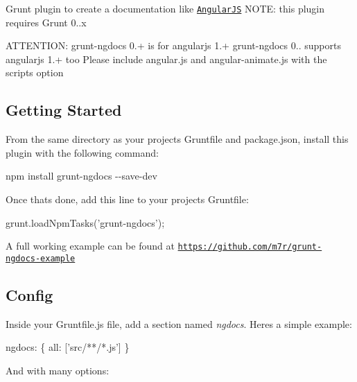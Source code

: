 Grunt plugin to create a documentation like \href{http://docs.angularjs.org}{\tt Angular\+J\+S} N\+O\+T\+E\+: this plugin requires Grunt 0..\+x

A\+T\+T\+E\+N\+T\+I\+O\+N\+: grunt-\/ngdocs 0.+ is for angularjs 1.+ grunt-\/ngdocs 0.. supports angularjs 1.+ too Please include angular.\+js and angular-\/animate.\+js with the scripts option

\subsection*{Getting Started}

From the same directory as your project\textquotesingle{}s Gruntfile and package.\+json, install this plugin with the following command\+:

{\ttfamily npm install grunt-\/ngdocs -\/-\/save-\/dev}

Once that\textquotesingle{}s done, add this line to your project\textquotesingle{}s Gruntfile\+:


\begin{DoxyCode}
grunt.loadNpmTasks(\textcolor{stringliteral}{'grunt-ngdocs'});
\end{DoxyCode}


A full working example can be found at \href{https://github.com/m7r/grunt-ngdocs-example}{\tt https\+://github.\+com/m7r/grunt-\/ngdocs-\/example}

\subsection*{Config}

Inside your {\ttfamily Gruntfile.\+js} file, add a section named {\itshape ngdocs}. Here\textquotesingle{}s a simple example\+:


\begin{DoxyCode}
ngdocs: \{
  all: [\textcolor{stringliteral}{'src/**/*.js'}]
\}
\end{DoxyCode}


And with many options\+:



